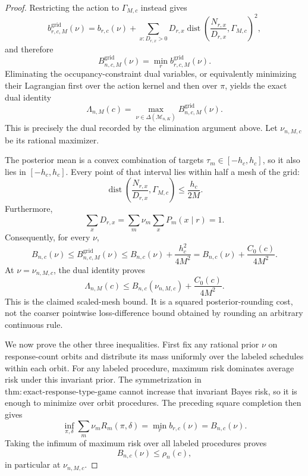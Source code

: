 \documentclass{article}
\begin{document}
\begin{proof}
Restricting the action to \(\Gamma_{M,c}\) instead gives
\[
 b^{\mathrm{grid}}_{r,c,M}(\nu)
 =b_{r,c}(\nu)+
 \sum_{x:D_{r,x}>0}D_{r,x}
 \operatorname{dist}\!\left(
 \frac{N_{r,x}}{D_{r,x}},\Gamma_{M,c}\right)^2,
\]
and therefore
\[
 B^{\mathrm{grid}}_{n,c,M}(\nu)
 =\min_r b^{\mathrm{grid}}_{r,c,M}(\nu).
\]
Eliminating the occupancy-constraint dual variables, or equivalently minimizing their Lagrangian first over the action kernel and then over \(\pi\), yields the exact dual identity
\[
 \Lambda_{n,M}(c)
 =\max_{\nu\in\Delta(\mathcal M_{n,K})}
 B^{\mathrm{grid}}_{n,c,M}(\nu).
\]
This is precisely the dual recorded by the elimination argument above.  Let \(\nu_{n,M,c}\) be its rational maximizer.

The posterior mean is a convex combination of targets \(\tau_m\in[-h_c,h_c]\), so it also lies in \([-h_c,h_c]\).  Every point of that interval lies within half a mesh of the grid:
\[
 \operatorname{dist}\!\left(
 \frac{N_{r,x}}{D_{r,x}},\Gamma_{M,c}\right)
 \leq\frac{h_c}{2M}.
\]
Furthermore,
\[
 \sum_xD_{r,x}
 =\sum_m\nu_m\sum_xP_m(x\mid r)=1.
\]
Consequently, for every \(\nu\),
\[
 B_{n,c}(\nu)\leq B^{\mathrm{grid}}_{n,c,M}(\nu)
 \leq B_{n,c}(\nu)+\frac{h_c^2}{4M^2}
 =B_{n,c}(\nu)+\frac{C_0(c)}{4M^2}.
\]
At \(\nu=\nu_{n,M,c}\), the dual identity proves
\[
 \Lambda_{n,M}(c)
 \leq B_{n,c}(\nu_{n,M,c})+\frac{C_0(c)}{4M^2}.
\]
This is the claimed scaled-mesh bound.  It is a squared posterior-rounding cost, not the coarser pointwise loss-difference bound obtained by rounding an arbitrary continuous rule.

We now prove the other three inequalities.  First fix any rational prior \(\nu\) on response-count orbits and distribute its mass uniformly over the labeled schedules within each orbit.  For any labeled procedure, maximum risk dominates average risk under this invariant prior.  The symmetrization in \(\mathrm{thm:exact\text{-}response\text{-}type\text{-}game}\) cannot increase that invariant Bayes risk, so it is enough to minimize over orbit procedures.  The preceding square completion then gives
\[
 \inf_{\pi,\delta}\sum_m\nu_mR_m(\pi,\delta)
 =\min_rb_{r,c}(\nu)=B_{n,c}(\nu).
\]
Taking the infimum of maximum risk over all labeled procedures proves
\[
 B_{n,c}(\nu)\leq\rho_n(c),
\]
in particular at \(\nu_{n,M,c}\).


\end{proof}
\end{document}

